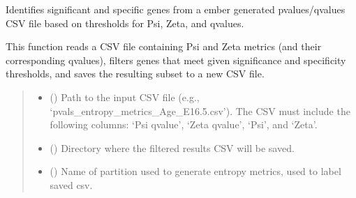 \documentclass[letterpaper,10pt,english]{sphinxmanual}
\begin{document}

\begin{fulllineitems}
\label{\detokenize{ember_py:ember_py.top_genes.highly_specific_to_partition}}
\pysigstartsignatures
\pysiglinewithargsret
{}
{\sphinxparamcomma {}\sphinxparamcomma {}\sphinxparamcomma {}\sphinxparamcomma {}\sphinxparamcomma {}}
{}
\pysigstopsignatures
\sphinxAtStartPar
Identifies significant and specific genes from a ember generated
p\sphinxhyphen{}values/q\sphinxhyphen{}values CSV file based on thresholds for Psi, Zeta, and q\sphinxhyphen{}values.

\sphinxAtStartPar
This function reads a CSV file containing Psi and Zeta metrics (and their
corresponding q\sphinxhyphen{}values), filters genes that meet given significance and
specificity thresholds, and saves the resulting subset to a new CSV file.
\begin{quote}\begin{description}
\begin{itemize}
\item {} 
\sphinxAtStartPar
{} (\sphinxstyleliteralemphasis{\sphinxupquote{, }}) \textendash{} Path to the input CSV file (e.g., ‘pvals\_entropy\_metrics\_Age\_E16.5.csv’).
The CSV must include the following columns:
‘Psi q\sphinxhyphen{}value’, ‘Zeta q\sphinxhyphen{}value’, ‘Psi’, and ‘Zeta’.

\item {} 
\sphinxAtStartPar
{} (\sphinxstyleliteralemphasis{\sphinxupquote{, }}) \textendash{} Directory where the filtered results CSV will be saved.

\item {} 
\sphinxAtStartPar
{} () \textendash{} Name of partition used to generate entropy metrics, used to label saved csv.


\end{itemize}
\end{description}
\end{quote}
\end{fulllineitems}
\end{document}
